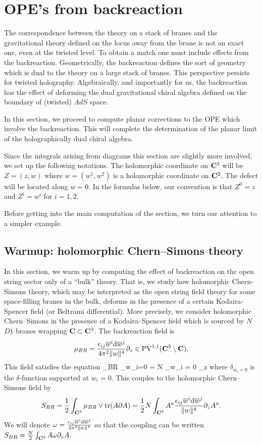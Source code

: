 \documentclass[../main.tex]{subfiles}
\begin{document}
\section{OPE's from backreaction}\label{sec:br}

The correspondence between the theory on a stack of branes and the gravitational theory defined on the locus away from the brane is not an exact one, even at the twisted level.
To obtain a match one must include effects from the backreaction.
Geometrically, the backreaction defines the sort of geometry which is dual to the theory on a large stack of branes.
This perspective persists for twisted holography.
Algebraically, and importantly for us, the backreaction has the effect of deforming the dual gravitational chiral algebra defined on the boundary of (twisted) $AdS$ space.

In this section, we proceed to compute planar corrections to the OPE which involve the backreaction. 
This will complete the determination of the planar limit of the holographically dual chiral algebra.

Since the integrals arising from diagrams this section are slightly more involved, we set up the following notations.
The holomorphic coordinate on $\mathbf{C}^3$ will be $Z = (z , w)$ where $w = (w^1,w^2)$ is a holomorphic coordinate on $\mathbf{C}^2$.
The defect will be located along $w = 0$.
In the formulas below, our convention is that $Z^0 = z$ and $Z^i = w^i$ for $i=1,2$.

Before getting into the main computation of the section, we turn our attention to a simpler example.

\subsection{Warmup: holomorphic Chern--Simons theory}

In this section, we warm up by computing the effect of backreaction on the open string sector only of a ``bulk'' theory. That is, we study how holomorphic Chern-Simons theory, which may be interpreted as the open string field theory for some space-filling branes in the bulk, deforms in the presence of a certain Kodaira-Spencer field (or Beltrami differential). 
More precisely, we consider holomorphic Chern--Simons in the presence of a Kodaira--Spencer field which is sourced by $N$ $D1$ branes wrapping $\mathbf{C} \subset \mathbf{C}^3$. 
The backreaction field is 
\[
\mu_{BR} = \frac{{\epsilon}_{ij} \overline{w}^i \mathrm{d} \overline{w}^j}{4 \pi^2 \|w\|^4} \partial_z \in {\rm PV}^{1,1} (\mathbf{C}^3 \setminus \mathbf{C}) . 
\]
This field satisfies the equation
\beqn\label{eqn:csBR}
\dbar \mu_{BR} \wedge \Omega_{w_i=0} = N \delta_{w_i = 0} \del_z 
\eeqn
where $\delta_{w_i=0}$ is the $\delta$-function supported at $w_i=0$.
This couples to the holomorphic Chern--Simons field by 
\[
S_{BR} = \frac12 \int_{\mathbf{C}^3} \mu_{BR} \vee \operatorname{tr}(A \partial A) = \frac12 N \int_{\mathbf{C}^3} A^a \frac{{\epsilon}_{ij} \overline{w}^i \mathrm{d} \overline{w}^j}{\|w\|^4} \partial_z A^a .
\]
We will denote $\omega = \frac{{\epsilon}_{ij} \overline{w}^i \mathrm{d} \overline{w}^j}{4 \pi^2\|w\|^4}$ so that the coupling can be written $S_{BR} = \frac{N}{2}
\int_{\mathbf{C}^3} A \omega \partial_z A.$
\end{document}
